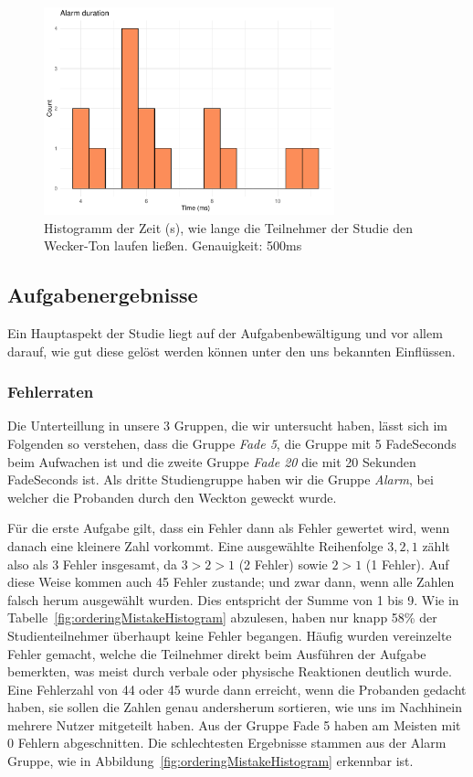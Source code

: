 \begin{figure}[H]
	\centering
	\includegraphics[width=0.75\textwidth]{./_StudyResults/alarmDurationHist}
	\caption{Histogramm der Zeit (s), wie lange die Teilnehmer der Studie den Wecker-Ton laufen ließen. Genauigkeit: 500ms}
	\label{fig:alarmDurationHist}
\end{figure}

\subsection{Aufgabenergebnisse} 

Ein Hauptaspekt der Studie liegt auf der Aufgabenbewältigung und vor allem darauf, wie gut diese gelöst werden können unter den uns bekannten Einflüssen. 

\subsubsection{Fehlerraten}

Die Unterteillung in unsere 3 Gruppen, die wir untersucht haben, lässt sich im Folgenden so verstehen, dass die Gruppe \textit{Fade 5}, die Gruppe mit 5 FadeSeconds beim Aufwachen ist und die zweite Gruppe \textit{Fade 20} die mit 20 Sekunden FadeSeconds ist. Als dritte Studiengruppe haben wir die Gruppe \textit{Alarm}, bei welcher die Probanden durch den Weckton geweckt wurde.

Für die erste Aufgabe gilt, dass ein Fehler dann als Fehler gewertet wird, wenn danach eine kleinere Zahl vorkommt. Eine ausgewählte Reihenfolge $3, 2, 1$ zählt also als 3 Fehler insgesamt, da $3 > 2 > 1$ (2 Fehler) sowie $2 > 1$ (1 Fehler). Auf diese Weise kommen auch 45 Fehler zustande; und zwar dann, wenn alle Zahlen falsch herum ausgewählt wurden. Dies entspricht der Summe von 1 bis 9.
Wie in Tabelle~\ref{fig:orderingMistakeHistogram} abzulesen, haben nur knapp 58\% der Studienteilnehmer überhaupt keine Fehler begangen. Häufig wurden vereinzelte Fehler gemacht, welche die Teilnehmer direkt beim Ausführen der Aufgabe bemerkten, was meist durch verbale oder physische Reaktionen deutlich wurde. 
Eine Fehlerzahl von 44 oder 45 wurde dann erreicht, wenn die Probanden gedacht haben, sie sollen die Zahlen genau andersherum sortieren, wie uns im Nachhinein mehrere Nutzer mitgeteilt haben.
Aus der Gruppe Fade 5 haben am Meisten mit 0 Fehlern abgeschnitten. Die schlechtesten Ergebnisse stammen aus der Alarm Gruppe, wie in Abbildung~\ref{fig:orderingMistakeHistogram} erkennbar ist. 


